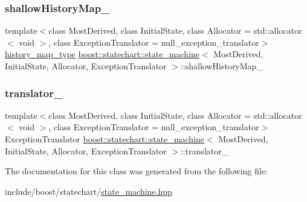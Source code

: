 \mbox{\label{classboost_1_1statechart_1_1state__machine_a799d498bd7ae723b79188f0316c38bbf}} 
\subsubsection{\texorpdfstring{shallow\+History\+Map\+\_\+}{shallowHistoryMap\_}}
{\footnotesize\ttfamily template$<$class Most\+Derived, class Initial\+State, class Allocator = std\+::allocator$<$ void $>$, class Exception\+Translator = null\+\_\+exception\+\_\+translator$>$ \\
\mbox{\hyperlink{classboost_1_1statechart_1_1state__machine_a9b8fdd7b5af3b0c9143f9d6fb4036ff7}{history\+\_\+map\+\_\+type}} \mbox{\hyperlink{classboost_1_1statechart_1_1state__machine}{boost\+::statechart\+::state\+\_\+machine}}$<$ Most\+Derived, Initial\+State, Allocator, Exception\+Translator $>$\+::shallow\+History\+Map\+\_\+\hspace{0.3cm}{\ttfamily [private]}}

\mbox{\label{classboost_1_1statechart_1_1state__machine_adbb6619d6e1365b97f08a0558f3e0821}} 
\subsubsection{\texorpdfstring{translator\+\_\+}{translator\_}}
{\footnotesize\ttfamily template$<$class Most\+Derived, class Initial\+State, class Allocator = std\+::allocator$<$ void $>$, class Exception\+Translator = null\+\_\+exception\+\_\+translator$>$ \\
Exception\+Translator \mbox{\hyperlink{classboost_1_1statechart_1_1state__machine}{boost\+::statechart\+::state\+\_\+machine}}$<$ Most\+Derived, Initial\+State, Allocator, Exception\+Translator $>$\+::translator\+\_\+\hspace{0.3cm}{\ttfamily [private]}}



The documentation for this class was generated from the following file\+:\begin{DoxyCompactItemize}
\item 
include/boost/statechart/\mbox{\hyperlink{state__machine_8hpp}{state\+\_\+machine.\+hpp}}\end{DoxyCompactItemize}
